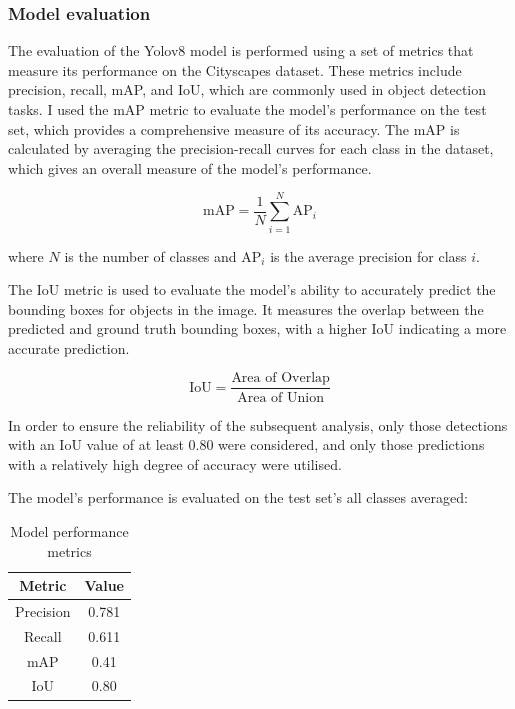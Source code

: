 \subsubsection{Model evaluation}\label{subsubsec:model-evaluation}
The evaluation of the Yolov8 model is performed using a set of metrics that measure its performance on the Cityscapes dataset.
These metrics include precision, recall, mAP, and IoU, which are commonly used in object detection tasks.
I used the mAP metric to evaluate the model's performance on the test set, which provides a comprehensive measure of its accuracy.
The mAP is calculated by averaging the precision-recall curves for each class in the dataset, which gives an overall measure of the model's performance.

\begin{equation}
\text{mAP} = \frac{1}{N} \sum_{i=1}^{N} \text{AP}_i
\end{equation}


where \( N \) is the number of classes and \( \text{AP}_i \) is the average precision for class \( i \).

The IoU metric is used to evaluate the model's ability to accurately predict the bounding boxes for objects in the image.
It measures the overlap between the predicted and ground truth bounding boxes, with a higher IoU indicating a more accurate prediction.

\begin{equation}
\text{IoU} = \frac{\text{Area of Overlap}}{\text{Area of Union}}
\end{equation}


In order to ensure the reliability of the subsequent analysis, only those detections with an IoU value of at least 0.80 were considered,
and only those predictions with a relatively high degree of accuracy were utilised.

The model's performance is evaluated on the test set's all classes averaged:
\begin{table}[h!]
\centering
\begin{tabular}{|c|c|}
\hline
\textbf{Metric} & \textbf{Value} \\
\hline
Precision & 0.781 \\
\hline
Recall & 0.611 \\
\hline
mAP & 0.41 \\
\hline
IoU & 0.80 \\
\hline
\end{tabular}
\caption{Model performance metrics}
\label{tab:model-performance-metrics}
\end{table}



